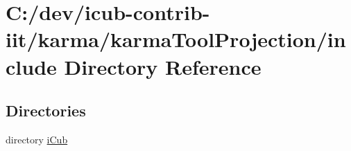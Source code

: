 \section{C\+:/dev/icub-\/contrib-\/iit/karma/karma\+Tool\+Projection/include Directory Reference}
\label{dir_e5f4742aadeb5fda1edcc8b135fd66d1}
\subsection*{Directories}
\begin{DoxyCompactItemize}
\item 
directory \hyperlink{dir_cd53ebd3e829865424f05673e33cf75a}{i\+Cub}
\end{DoxyCompactItemize}
